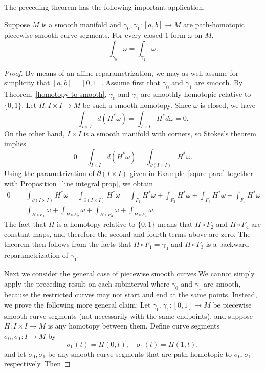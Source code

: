 The preceding theorem has the following important application.
\begin{theorem}\label{int homotopy path}
Suppose $M$ is a smooth manifold and $\gamma_0,\gamma_1:[a,b]\to M$ are path-homotopic piecewise smooth curve segments. For every closed $1$-form $\omega$ on $M$,
\[\int_{\gamma_0}\omega=\int_{\gamma_1}\omega.\]
\end{theorem}
\begin{proof}
By means of an affine reparametrization, we may as well assume for simplicity that $[a,b]=[0,1]$. Assume first that $\gamma_0$ and $\gamma_1$ are smooth. By Theorem~\ref{homotopy to smooth}, $\gamma_0$ and $\gamma_1$ are smoothly homotopic relative to $\{0,1\}$. Let $H:I\times I\to M$ be such a smooth homotopy. Since $\omega$ is closed, we have
\[\int_{I\times I}d(H^*\omega)=\int_{I\times I}H^*d\omega=0.\]
On the other hand, $I\times I$ is a smooth manifold with corners, so Stokes's theorem
implies
\[0=\int_{I\times I}d(H^*\omega)=\int_{\partial(I\times I)}H^*\omega.\]
Using the parametrization of $\partial(I\times I)$ given in Example~\ref{squre para} together with Proposition~\ref{line integral prop}, we obtain
\begin{align*}
0&=\int_{\partial(I\times I)}H^*\omega=\int_{\partial(I\times I)}H^*\omega=\int_{F_1}H^*\omega+\int_{F_2}H^*\omega+\int_{F_3}H^*\omega+\int_{F_4}H^*\omega\\
&=\int_{H\circ F_1}\omega+\int_{H\circ F_2}\omega+\int_{H\circ F_3}\omega+\int_{H\circ F_4}\omega.
\end{align*}
The fact that $H$ is a homotopy relative to $\{0,1\}$ means that $H\circ F_2$ and $H\circ F_4$ are constant maps, and therefore the second and fourth terms above are zero. The theorem then follows from the facts that $H\circ F_1=\gamma_0$ and $H\circ F_3$ is a backward reparametrization of $\gamma_1$.\par
Next we consider the general case of piecewise smooth curves.We cannot simply
apply the preceding result on each subinterval where $\gamma_0$ and $\gamma_1$ are smooth, because the restricted curves may not start and end at the same points. Instead, we prove the following more general claim: Let $\gamma_0,\gamma_1:[0,1]\to M$ be piecewise smooth curve segments (not necessarily with the same endpoints), and suppose $H:I\times I\to M$ is any homotopy between them. Define curve segments $\sigma_0,\sigma_1:I\to M$ by
\[\sigma_0(t)=H(0,t),\quad \sigma_1(t)=H(1,t),\]
and let $\widetilde{\sigma}_0,\widetilde{\sigma}_1$ be any smooth curve segments that are path-homotopic to $\sigma_0,\sigma_1$ respectively. Then

\end{proof}
